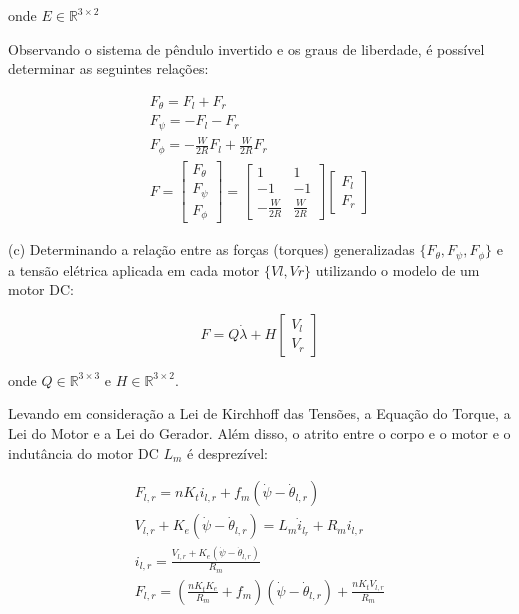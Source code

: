 \documentclass[10pt]{article}
\begin{document}
onde $E \in \mathbb{R}^{3\times 2}$

\quad Observando o sistema de pêndulo invertido e os graus de liberdade,
é possível determinar as seguintes relações:

\begin{equation}
\begin{gathered}
    F_\theta = F_l + F_r \\
    F_\psi = - F_l - F_r \\
    F_\phi = - \frac{W}{2R}F_l + \frac{W}{2R}F_r \\
    F =
    \begin{bmatrix}
        F_{\theta} \\
        F_{\psi} \\
        F_{\phi}
    \end{bmatrix} =
    \begin{bmatrix}
        1 & 1 \\
        -1 & -1 \\
        -\frac{W}{2R} & \frac{W}{2R}
    \end{bmatrix}
    \begin{bmatrix}
        F_l \\
        F_r
    \end{bmatrix} 
\end{gathered}
\end{equation}

\quad (c) Determinando a relação entre as forças (torques) generalizadas $\{F_\theta, F_\psi, F_\phi\}$
e a tensão elétrica aplicada em cada motor $\{Vl,Vr\}$ utilizando o modelo de um motor DC:

\begin{equation}
    F = Q \dot\lambda + H
    \begin{bmatrix}
        V_l \\ V_r
    \end{bmatrix}
\end{equation}

onde $Q \in \mathbb{R}^{3 \times 3}$ e $H \in \mathbb{R}^{3 \times 2}$.

\quad Levando em consideração a Lei de Kirchhoff das Tensões, a Equação do Torque, a Lei do Motor e a Lei do Gerador.
Além disso, o atrito entre o corpo e o motor e o indutância do motor DC $L_m$ é desprezível:

\begin{equation}
\begin{gathered}
    F_{l,r} = nK_ti_{l,r} + f_m(\dot\psi - \dot\theta_{l,r}) \\
    V_{l,r} + K_e(\dot\psi - \dot\theta_{l,r}) = L_m\dot{i}_{l_r} + R_mi_{l,r} \\
    i_{l,r} = \frac{V_{l,r} + K_e(\dot\psi - \dot\theta_{l,r})}{R_m} \\
    F_{l,r} = \left(\frac{nK_tK_e}{R_m} + f_m\right)(\dot\psi - \dot\theta_{l,r}) + \frac{nK_tV_{l,r}}{R_m}
\end{gathered}
\end{equation}
\end{document}
